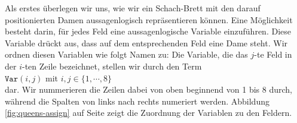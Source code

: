 Als erstes \"{u}berlegen wir uns, wie wir ein Schach-Brett mit den darauf
positionierten Damen aussagenlogisch repr\"{a}sentieren k\"{o}nnen.  Eine M\"{o}glichkeit besteht darin, 
f\"{u}r jedes Feld eine aussagenlogische Variable einzuf\"{u}hren.  Diese Variable dr\"{u}ckt
aus, dass auf dem entsprechenden Feld eine Dame steht.  Wir ordnen diesen Variablen wie
folgt Namen zu:  Die Variable, die das $j$-te Feld in der $i$-ten
Zeile bezeichnet, stellen wir durch den Term \\[0.2cm]
\hspace*{1.3cm} $\mathtt{Var}(i,j)$ \quad mit $i,j \in \{1, \cdots, 8\}$ \\[0.2cm]
dar. Wir nummerieren die Zeilen dabei von oben beginnend von 1 bis 8 durch, w\"{a}hrend die
Spalten von links nach rechts numeriert werden.  Abbildung \ref{fig:queens-assign} auf
Seite \pageref{fig:queens-assign} zeigt die Zuordnung der Variablen zu den Feldern.

